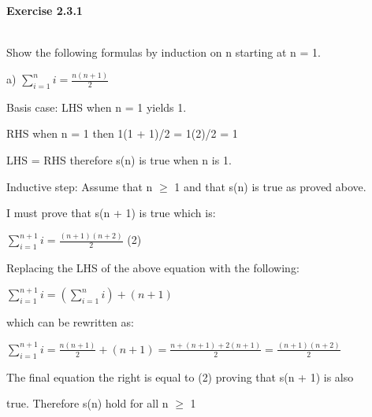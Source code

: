 \documentclass[12pt]{article}
\begin{document}
\begin{title}
    \centering
    {\LARGE\bfseries Exercise 2.3.1}
\end{title}\\

\vspace{10mm} %
Show the following formulas by induction on n starting at n = 1.

\vspace{5mm} %

a) $\sum_{i=1}^{n}i = \frac{n(n+1)}{2}$\par

\vspace{5mm} %

Basis case: LHS when n = 1 yields 1.\par

\vspace{5mm} %

RHS when n = 1 then 1(1 + 1)/2 = 1(2)/2 = 1\par

LHS = RHS therefore s(n) is true when n is 1.\par

Inductive step: Assume that n $\geq$ 1 and that s(n) is true as proved above.\par I must prove that s(n + 1) is true which is:\par

\vspace{5mm} %

$\sum_{i=1}^{n+1}i = \frac{(n+1)(n+2)}{2}$   \hfil\hfil\hfil (2)\par

\vspace{5mm} %

Replacing the LHS of the above equation with the following:\par

\vspace{5mm} %

$\sum_{i=1}^{n+1}i = (\sum_{i=1}^{n}i) + (n + 1)$\par

\vspace{5mm} %

which can be rewritten as:\par

\vspace{5mm} %

$\sum_{i=1}^{n+1}i = \frac{n(n+1)}{2} + (n + 1) = \frac{n+(n+1)+2(n+1)}{2} = \frac{(n+1)(n+2)}{2}$\par

\vspace{5mm} %

The final equation the right is equal to (2) proving that s(n + 1) is also\par true.
Therefore s(n) hold for all n $\geq$ 1
\end{document}
